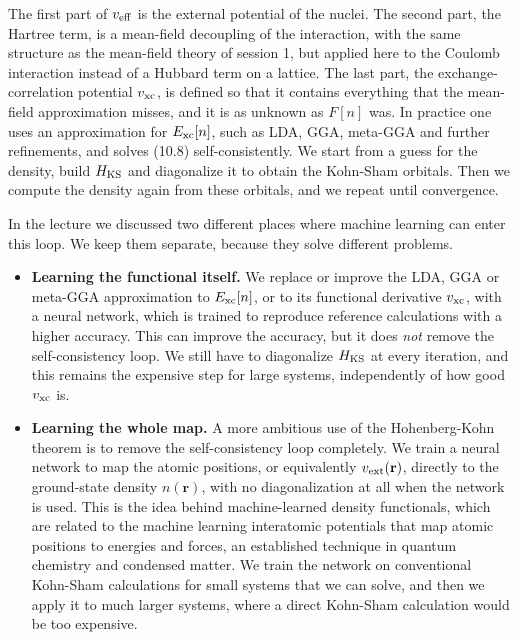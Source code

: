The first part of $v_{\rm eff}$ is the external potential of the nuclei. The second part, the
Hartree term, is a mean-field decoupling of the interaction, with the same structure as the
mean-field theory of session 1, but applied here to the Coulomb interaction instead of a Hubbard
term on a lattice. The last part, the exchange-correlation potential $v_{\rm xc}$, is defined so
that it contains everything that the mean-field approximation misses, and it is as unknown as
$F[n]$ was. In practice one uses an approximation for $E_{\rm xc}[n]$, such as LDA, GGA, meta-GGA
and further refinements, and solves (10.8) self-consistently. We start from a guess for the density,
build $H_{\rm KS}$ and diagonalize it to obtain the Kohn-Sham orbitals. Then we compute the density
again from these orbitals, and we repeat until convergence.

In the lecture we discussed two different places where machine learning can enter this loop. We
keep them separate, because they solve different problems.

\begin{itemize}
\item \textbf{Learning the functional itself.} We replace or improve the LDA, GGA or meta-GGA
  approximation to $E_{\rm xc}[n]$, or to its functional derivative $v_{\rm xc}$, with a neural
  network, which is trained to reproduce reference calculations with a higher accuracy. This can
  improve the accuracy, but it does \emph{not} remove the self-consistency loop. We still have to
  diagonalize $H_{\rm KS}$ at every iteration, and this remains the expensive step for large
  systems, independently of how good $v_{\rm xc}$ is.
\item \textbf{Learning the whole map.} A more ambitious use of the Hohenberg-Kohn theorem is to
  remove the self-consistency loop completely. We train a neural network to map the atomic
  positions, or equivalently $v_{\rm ext}(\mathbf{r})$, directly to the ground-state density
  $n(\mathbf{r})$, with no diagonalization at all when the network is used. This is the idea behind
  machine-learned density functionals, which are related to the machine learning interatomic
  potentials that map atomic positions to energies and forces, an established technique in quantum
  chemistry and condensed matter. We train the network on conventional Kohn-Sham calculations for small
  systems that we can solve, and then we apply it to much larger systems, where a direct Kohn-Sham
  calculation would be too expensive.
\end{itemize}

